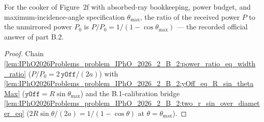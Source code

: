 \begin{theorem}
\label{thm:IPhO2026Problems_problem_IPhO_2026_2_B_2:power_ratio_in_terms_of_theta_max}
For the cooker of Figure~2f with absorbed-ray bookkeeping, power budget,
and maximum-incidence-angle specification $\theta_{\max}$, the ratio of
the received power $P$ to the unmirrored power $P_0$ is
$P / P_0 = 1 / (1 - \cos\theta_{\max})$ --- the recorded official
answer of part B.2.
\end{theorem}
\begin{proof}
Chain
\cref{lem:IPhO2026Problems_problem_IPhO_2026_2_B_2:power_ratio_eq_width_ratio}
($P/P_0 = 2\,\texttt{yOff}/(2a)$) with
\cref{lem:IPhO2026Problems_problem_IPhO_2026_2_B_2:yOff_eq_R_sin_thetaMax}
($\texttt{yOff} = R\sin\theta_{\max}$) and the B.1-calibration bridge
\cref{lem:IPhO2026Problems_problem_IPhO_2026_2_B_2:two_r_sin_over_diameter_eq}
($2R\sin\theta/(2a) = 1/(1-\cos\theta)$ at
$\theta = \theta_{\max}$).
\end{proof}
